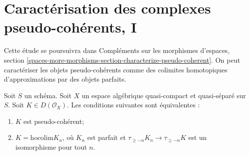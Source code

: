 \section{Caract\'erisation des complexes pseudo-coh\'erents, I}
\label{section-pseudo-coherent-hocolim}

\noindent
Cette \'etude se poursuivra dans Compl\'ements sur les morphismes d'espaces,
section
\ref{spaces-more-morphisms-section-characterize-pseudo-coherent}.
On peut caract\'eriser les objets pseudo-coh\'erents
comme des colimites homotopiques d'approximations par des objets parfaits.

\begin{lemma}
\label{lemma-pseudo-coherent-hocolim}
Soit $S$ un sch\'ema.
Soit $X$ un espace alg\'ebrique quasi-compact et quasi-s\'epar\'e sur $S$.
Soit $K \in D(\mathcal{O}_X)$. Les conditions suivantes sont \'equivalentes :
\begin{enumerate}
\item $K$ est pseudo-coh\'erent;
\item $K = \text{hocolim} K_n$, o\`u
$K_n$ est parfait et $\tau_{\geq -n}K_n \to \tau_{\geq -n}K$
est un isomorphisme pour tout $n$.
\end{enumerate}
\end{lemma}

